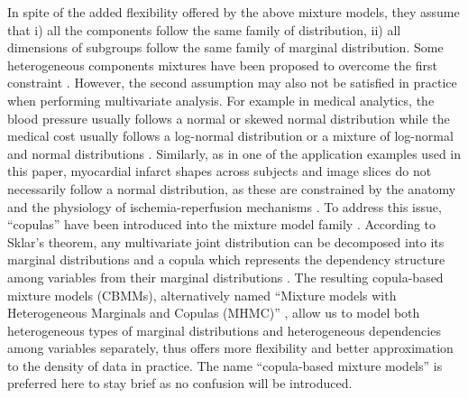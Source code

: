 In spite of the added flexibility offered by the above mixture models, they assume that i) all the components follow the same family of distribution, ii) all dimensions of subgroups follow the same family of marginal distribution. Some heterogeneous components mixtures have been proposed to overcome the first constraint \cite{li2016statistical, huang2019probability}. However, the second assumption may also not be satisfied in practice when performing multivariate analysis. For example in medical analytics, the blood pressure usually follows a normal or skewed normal distribution while the medical cost usually follows a log-normal distribution or a mixture of log-normal and normal distributions \cite{fujimaki2011online}. Similarly, as in one of the application examples used in this paper, myocardial infarct shapes across subjects and image slices do not necessarily follow a normal distribution, as these are constrained by the anatomy and the physiology of ischemia-reperfusion mechanisms \cite{Duchateau:FrontCV:20233}.
To address this issue, ``copulas'' have been introduced into the mixture model family \cite{nelsen2007introduction}. %
According to Sklar's theorem, any multivariate joint distribution can be decomposed into its marginal distributions and a copula which represents the dependency structure among variables from their marginal distributions \cite{sklar1959fonctions}. %
The resulting copula-based mixture models (CBMMs), alternatively named ``Mixture models with Heterogeneous Marginals and Copulas (MHMC)'' \cite{fujimaki2011online}, allow us to model both heterogeneous types of marginal distributions and heterogeneous dependencies among variables separately, thus offers more flexibility and better approximation to the density of data in practice. The name ``copula-based mixture models'' is preferred here to stay brief as no confusion will be introduced.

